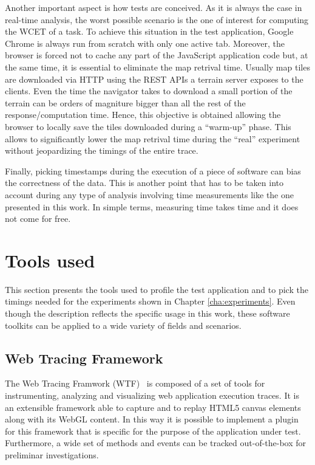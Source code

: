 Another important aspect is how tests are conceived. As it is always the case in
real-time analysis, the worst possible scenario is the one of interest for
computing the WCET of a task. To achieve this situation in the test application,
Google Chrome is always run from scratch with only one active tab. Moreover, the browser
is forced not to cache any part of the JavaScript application code but,
at the same time, it is essential to eliminate the map retrival time.
Usually map tiles are
downloaded via HTTP using the REST APIs a terrain server exposes to the clients.
Even the time the navigator takes to download a small portion of the terrain
can be orders of magniture bigger than all the rest of the response/computation time.
Hence, this objective is obtained allowing the browser to locally save the
tiles downloaded during a ``warm-up'' phase. This allows to significantly lower
the map retrival time during the ``real'' experiment without jeopardizing the
timings of the entire trace.

Finally, picking timestamps during the execution of a piece of software can bias
the correctness of the data. This is another point that has to be
taken into account during any type of analysis involving time measurements like
the one presented in this work. In simple terms, measuring time takes time and
it does not come for free.


\section{Tools used}
This section presents the tools used to profile the test application and to pick
the timings needed for the experiments shown in Chapter \ref{cha:experiments}.
Even though the description reflects the specific usage in this work, these
software toolkits can be applied to a wide variety of fields and scenarios.

\subsection{Web Tracing Framework} \label{sec:wtf}
The Web Tracing Framwork (WTF)~\cite{wtf} is composed of a set of tools for
instrumenting, analyzing and visualizing web application execution traces.
It is an extensible framework able to capture and to replay HTML5 canvas elements
along with its WebGL content. In this way it is possible to implement a plugin for
this framework that is specific for the purpose of the application under test.
Furthermore, a wide set
of methods and events can be tracked out-of-the-box for preliminar investigations.

